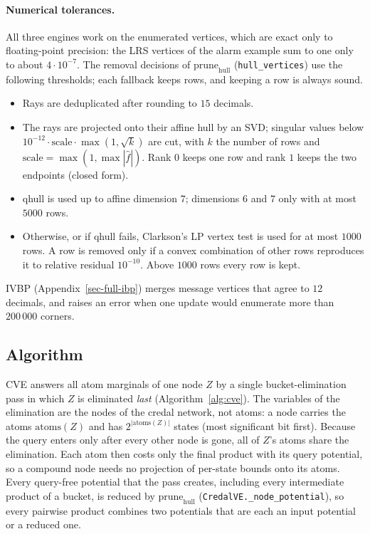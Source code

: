 \documentclass{article} %
\newcommand{\prune}{\mathrm{prune}}
\begin{document}
\paragraph{Numerical tolerances.} All three engines work on the enumerated vertices, which
are exact only to floating-point precision: the LRS vertices of the alarm example sum to
one only to about $4\cdot10^{-7}$. The removal decisions of $\prune_{\mathrm{hull}}$
(\texttt{hull\_vertices}) use the following thresholds; each fallback keeps rows, and keeping
a row is always sound.
\begin{itemize}
  \item Rays are deduplicated after rounding to $15$ decimals.
  \item The rays are projected onto their affine hull by an SVD; singular values below
    $10^{-12}\cdot\mathrm{scale}\cdot\max(1,\sqrt{k})$ are cut, with $k$ the number of rows
    and $\mathrm{scale}=\max(1,\max|\hat f|)$. Rank $0$ keeps one row and rank $1$ keeps the
    two endpoints (closed form).
  \item qhull is used up to affine dimension $7$; dimensions $6$ and $7$ only with at most
    $5000$ rows.
  \item Otherwise, or if qhull fails, Clarkson's LP vertex test is used for at most $1000$
    rows. A row is removed only if a convex combination of other rows reproduces it to
    relative residual $10^{-10}$. Above $1000$ rows every row is kept.
\end{itemize}
IVBP (Appendix~\ref{sec-full-ibp}) merges message vertices that agree to $12$ decimals, and
raises an error when one update would enumerate more than $200\,000$ corners.

\subsection{Algorithm}
\label{sec:algorithm}

CVE answers all atom marginals of one node $Z$ by a single bucket-elimination
pass in which $Z$ is eliminated \emph{last} (Algorithm~\ref{alg:cve}). The variables
of the elimination are the nodes of the credal network, not atoms: a node carries
the atoms $\mathrm{atoms}(Z)$ and has $2^{|\mathrm{atoms}(Z)|}$ states (most
significant bit first). Because the query enters only after every other node is
gone, all of $Z$'s atoms share the elimination. Each atom then costs only the final
product with its query potential, so a compound node needs no projection
of per-state bounds onto its atoms. Every query-free potential that the pass creates,
including every intermediate product of a bucket, is reduced by $\prune_{\mathrm{hull}}$
(\texttt{CredalVE.\_node\_potential}), so every pairwise product combines two potentials that
are each an input potential or a reduced one.
\end{document}
